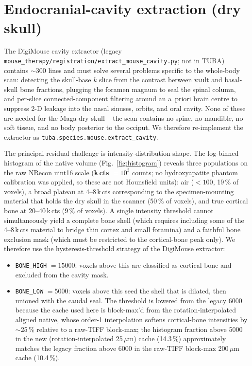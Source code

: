 \documentclass{compactarticle}
\begin{document}
\section{Endocranial-cavity extraction (dry skull)}
\label{sec:cavity}

The DigiMouse cavity extractor
(legacy \texttt{mouse\_therapy/registration/\allowbreak extract\_mouse\_cavity.py};
not in TUBA) contains $\sim$300 lines and must solve several problems specific to
the whole-body scan: detecting the skull-base $k$ slice from the
contrast between vault and basal-skull bone fractions, plugging the
foramen magnum to seal the spinal column, and per-slice connected-component
filtering around an a~priori brain centre to suppress 2-D leakage into
the nasal sinuses, orbits, and oral cavity. None of these are needed
for the Maga dry skull -- the scan contains no spine, no mandible, no
soft tissue, and no body posterior to the occiput. We therefore
re-implement the extractor as
\texttt{tuba.species.mouse.\allowbreak extract\_cavity}.

The principal residual challenge is intensity-distribution shape. The
log-binned histogram of the native volume (Fig.~\ref{fig:histogram})
reveals three populations on the raw NRecon uint16 scale (\textbf{k\,cts}
$=10^3$ counts; no hydroxyapatite phantom calibration was applied, so
these are not Hounsfield units): air ($<100$, 19\,\% of voxels), a
broad plateau at 4--8\,k\,cts corresponding to the specimen-mounting
material that holds the dry skull in the scanner (50\,\% of voxels), and
true cortical bone at 20--40\,k\,cts (9\,\% of voxels). A single intensity
threshold cannot simultaneously yield a complete bone shell (which
requires including some of the 4--8\,k\,cts material to bridge thin
cortex and small foramina) and a faithful bone exclusion mask (which
must be restricted to the cortical-bone peak only). We therefore use
the hysteresis-threshold strategy of the DigiMouse extractor:

\begin{itemize}[leftmargin=*]
\item \texttt{BONE\_HIGH} $= 15000$: voxels above this are classified as
      cortical bone and excluded from the cavity mask.
\item \texttt{BONE\_LOW}  $= 5000$: voxels above this seed the shell
      that is dilated, then unioned with the caudal seal. The threshold
      is lowered from the legacy 6000 because the cache used here is
      block-max'd from the rotation-interpolated aligned native, whose
      order-1 interpolation softens cortical-bone intensities by
      $\sim$25\,\% relative to a raw-TIFF block-max; the histogram
      fraction above 5000 in the new (rotation-interpolated 25\,$\mu$m)
      cache (14.3\,\%) approximately matches the legacy fraction
      above 6000 in the raw-TIFF block-max 200\,$\mu$m cache
      (10.4\,\%).
\end{itemize}
\end{document}

